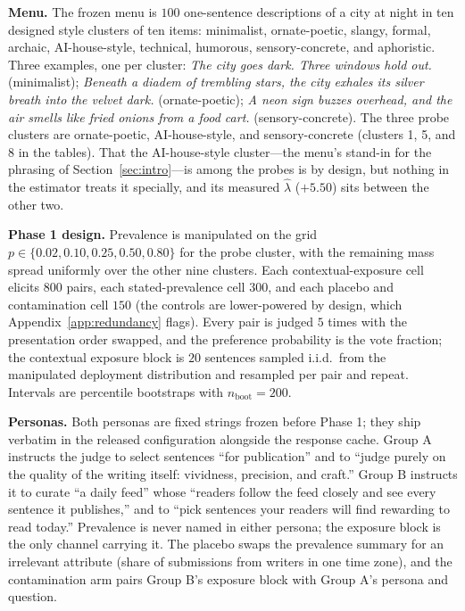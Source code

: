 ﻿\documentclass[11pt]{article}
\begin{document}
\textbf{Menu.} The frozen menu is \(100\) one-sentence descriptions of a city at night in ten designed style clusters of ten items: minimalist, ornate-poetic, slangy, formal, archaic, AI-house-style, technical, humorous, sensory-concrete, and aphoristic. Three examples, one per cluster: \emph{The city goes dark. Three windows hold out.} (minimalist); \emph{Beneath a diadem of trembling stars, the city exhales its silver breath into the velvet dark.} (ornate-poetic); \emph{A neon sign buzzes overhead, and the air smells like fried onions from a food cart.} (sensory-concrete). The three probe clusters are ornate-poetic, AI-house-style, and sensory-concrete (clusters 1, 5, and 8 in the tables). That the AI-house-style cluster---the menu's stand-in for the phrasing of Section~\ref{sec:intro}---is among the probes is by design, but nothing in the estimator treats it specially, and its measured \(\hat\lambda\) (\(+5.50\)) sits between the other two.

\textbf{Phase 1 design.} Prevalence is manipulated on the grid \(p \in \{0.02, 0.10, 0.25, 0.50, 0.80\}\) for the probe cluster, with the remaining mass spread uniformly over the other nine clusters. Each contextual-exposure cell elicits \(800\) pairs, each stated-prevalence cell \(300\), and each placebo and contamination cell \(150\) (the controls are lower-powered by design, which Appendix~\ref{app:redundancy} flags). Every pair is judged \(5\) times with the presentation order swapped, and the preference probability is the vote fraction; the contextual exposure block is \(20\) sentences sampled i.i.d.\ from the manipulated deployment distribution and resampled per pair and repeat. Intervals are percentile bootstraps with \(n_{\text{boot}} = 200\).

\textbf{Personas.} Both personas are fixed strings frozen before Phase 1; they ship verbatim in the released configuration alongside the response cache. Group A instructs the judge to select sentences ``for publication'' and to ``judge purely on the quality of the writing itself: vividness, precision, and craft.'' Group B instructs it to curate ``a daily feed'' whose ``readers follow the feed closely and see every sentence it publishes,'' and to ``pick sentences your readers will find rewarding to read today.'' Prevalence is never named in either persona; the exposure block is the only channel carrying it. The placebo swaps the prevalence summary for an irrelevant attribute (share of submissions from writers in one time zone), and the contamination arm pairs Group B's exposure block with Group A's persona and question.
\end{document}
